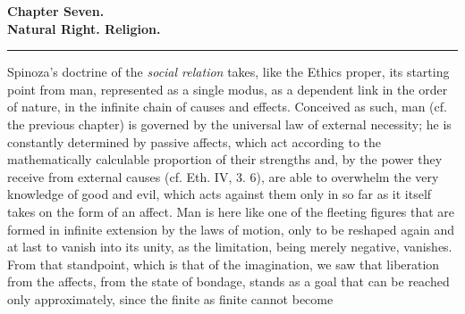 \documentclass[12pt,a4paper,openany]{book}
\begin{document}
\begin{center}
{\large\textbf{Chapter Seven.}}\\[4pt]
\textbf{Natural Right. Religion.}\\[6pt]
\rule{2cm}{0.4pt}
\end{center}
\bigskip
Spinoza's doctrine of the \emph{social relation} takes, like the Ethics proper, its starting point from man, represented as a single modus, as a dependent link in the order of nature, in the infinite chain of causes and effects. Conceived as such, man (cf. the previous chapter) is governed by the universal law of external necessity; he is constantly determined by passive affects, which act according to the mathematically calculable proportion of their strengths and, by the power they receive from external causes (cf. Eth. IV, 3. 6), are able to overwhelm the very knowledge of good and evil, which acts against them only in so far as it itself takes on the form of an affect. Man is here like one of the fleeting figures that are formed in infinite extension by the laws of motion, only to be reshaped again and at last to vanish into its unity, as the limitation, being merely negative, vanishes. From that standpoint, which is that of the imagination, we saw that liberation from the affects, from the state of bondage, stands as a goal that can be reached only approximately, since the finite as finite cannot become
\end{document}
